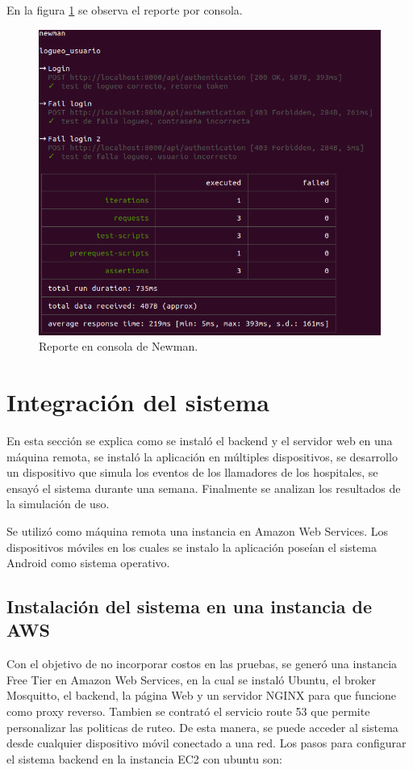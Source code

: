En la figura \ref{fig:reporte cli Newman} se observa el reporte por consola.
\begin{figure}[ht]
	\centering
	\includegraphics[scale=.50]{./Figures/newman-1.png}
	\caption{Reporte en consola de Newman.}
	\label{fig:reporte cli Newman}
\end{figure}




\pagebreak

\section{Integración del sistema}
\label{Integración del sistema}

En esta sección se explica como se instaló el backend y el servidor web en una máquina remota, se instaló la aplicación en múltiples dispositivos, se desarrollo un dispositivo que simula los eventos de los llamadores de los hospitales, se ensayó el sistema durante una semana.  Finalmente se analizan los resultados de la simulación de uso.

Se utilizó como máquina remota una instancia en Amazon Web Services. Los dispositivos móviles en los cuales se instalo la aplicación poseían el sistema Android como sistema operativo.

\subsection{Instalación del sistema en una instancia de AWS}
Con el objetivo de no incorporar costos en las pruebas, se generó una instancia Free Tier en Amazon Web Services, en la cual se instaló Ubuntu, el broker Mosquitto, el backend, la página Web y un servidor NGINX para que funcione como proxy reverso. Tambien se contrató el servicio route 53 que permite personalizar las politicas de ruteo.
De esta manera, se puede acceder al sistema desde cualquier dispositivo móvil conectado a una red.
Los pasos para configurar el sistema backend en la instancia EC2 con ubuntu son:
\pagebreak

